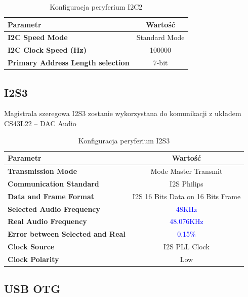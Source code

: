 \documentclass[10pt, a4paper]{article}
\begin{document}
\begin{table}[H]
	\centering
	\begin{tabular}{|l|c|} \hline
		\textbf{Parametr} & Wartość \\
		\hline
		\hline  \textbf{I2C Speed Mode}& Standard Mode \\  \hline
		\textbf{I2C Clock Speed (Hz) } & 100000 \\
		
		\hline  \textbf{Primary Address Length selection}& 7-bit  \\\hline

	\end{tabular}
	\caption{Konfiguracja peryferium I2C2}
	\label{tab:USART}
\end{table}
\subsection{I2S3}

Magistrala szeregowa I2S3 zostanie wykorzystana do komunikacji z układem CS43L22 -- DAC Audio 

\begin{table}[H]
	\centering
	\begin{tabular}{|l|c|} \hline
		\textbf{Parametr} & Wartość \\
		\hline
		\hline  \textbf{Transmission Mode}& Mode Master Transmit \\ 
		\hline  \textbf{Communication Standard} & I2S Philips \\
		\hline  \textbf{Data and Frame Format} & I2S 16 Bits Data on 16 Bits Frame \\
		\hline  \textbf{Selected Audio Frequency} & \textcolor{blue}{48KHz }\\
		\hline  \textbf{Real Audio Frequency} & \textcolor{blue}{48.076KHz} \\
		\hline  \textbf{Error between Selected and Real} & \textcolor{blue}{0.15{\%}}
		\\
	\hline  \textbf{Clock Source} & I2S PLL Clock  \\
	\hline  \textbf{Clock Polarity} & Low \\
	\hline

	\end{tabular}
	\caption{Konfiguracja peryferium I2S3}
	\label{tab:USART}
\end{table}



\subsection{USB OTG}
\end{document}
